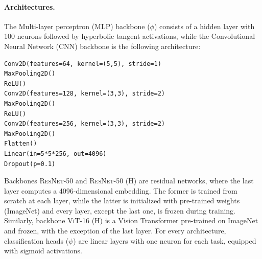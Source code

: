 \paragraph{Architectures.} The Multi-layer perceptron (\textsc{MLP}) backbone ($\phi$) consists of a hidden layer with 100 neurons followed by hyperbolic tangent activations, while the Convolutional Neural Network (\textsc{CNN}) backbone is the following architecture:
\begin{verbatim}
Conv2D(features=64, kernel=(5,5), stride=1)
MaxPooling2D()
ReLU()
Conv2D(features=128, kernel=(3,3), stride=2)
MaxPooling2D()
ReLU()
Conv2D(features=256, kernel=(3,3), stride=2)
MaxPooling2D()
Flatten()
Linear(in=5*5*256, out=4096)
Dropout(p=0.1)
\end{verbatim}
Backbones \textsc{ResNet-50} and \textsc{ResNet-50 (H)} are residual networks, where the last layer computes a 4096-dimensional embedding. The former is trained from scratch at each layer, while the latter is initialized with pre-trained weights (ImageNet) and every layer, except the last one, is frozen during training.
Similarly, backbone \textsc{ViT-16 (H)} is a Vision Transformer pre-trained on ImageNet and frozen, with the exception of the last layer.
For every architecture, classification heads ($\psi$) are linear layers with one neuron for each task, equipped with sigmoid activations. 

